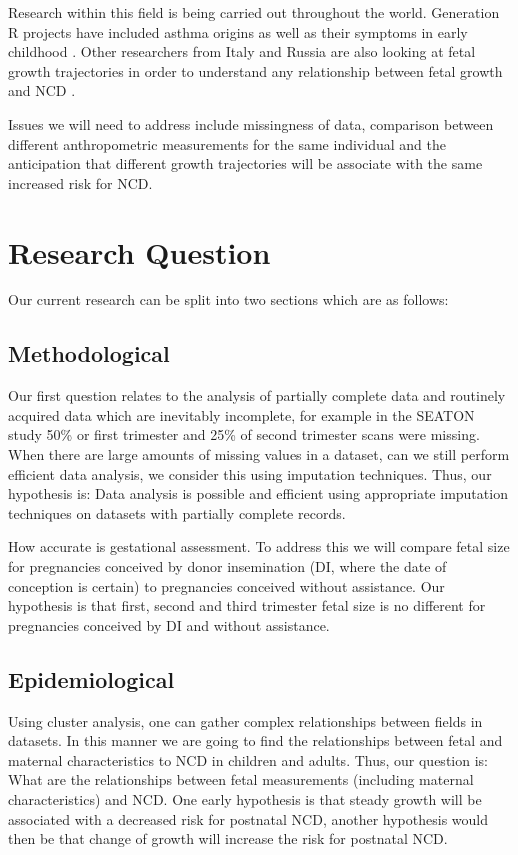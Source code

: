 \documentclass[bsc]{abdnthesis}
\begin{document}
Research within this field is being carried out throughout the world. Generation R projects have included asthma origins \cite{ generation-r1} as well as their symptoms in early childhood \cite{ generation-r2}. Other researchers from Italy and Russia are also looking at fetal growth trajectories in order to understand any relationship between fetal growth and NCD \cite{luccia1, luccia2, luccia3, luccia4}.

Issues we will need to address include missingness of data, comparison between different anthropometric measurements for the same individual and the anticipation that different growth trajectories will be associate with the same increased risk for NCD.   
\section{Research Question} %
\label{sec:research_question}
Our current research can be split into two sections which are as follows:
\subsection{Methodological} %
\label{sub:methodological}
Our first question relates to the analysis of partially complete data and routinely acquired data which are inevitably incomplete, for example in the SEATON study \cite{turner4, turner5} 50\% or first trimester and 25\% of second trimester scans were missing. When there are large amounts of missing values in a dataset, can we still perform efficient data analysis, we consider this using imputation techniques. Thus, our hypothesis is: Data analysis is possible and efficient using appropriate imputation techniques on datasets with partially complete records.

How accurate is gestational assessment. To address this we will compare fetal size for pregnancies conceived by donor insemination (DI, where the date of conception is certain) to pregnancies conceived without assistance. Our hypothesis is that first, second and third trimester fetal size is no different for pregnancies conceived by DI and without assistance.
\subsection{Epidemiological} %
\label{sub:epidemiological}
Using cluster analysis, one can gather complex relationships between fields in datasets. In this manner we are going to find the relationships between fetal and maternal characteristics to NCD in children and adults. Thus, our question is: What are the relationships between fetal measurements (including maternal characteristics) and NCD. One early hypothesis is that steady growth will be associated with a decreased risk for postnatal NCD, another hypothesis would then be that change of growth will increase the risk for postnatal NCD. 
\end{document}
